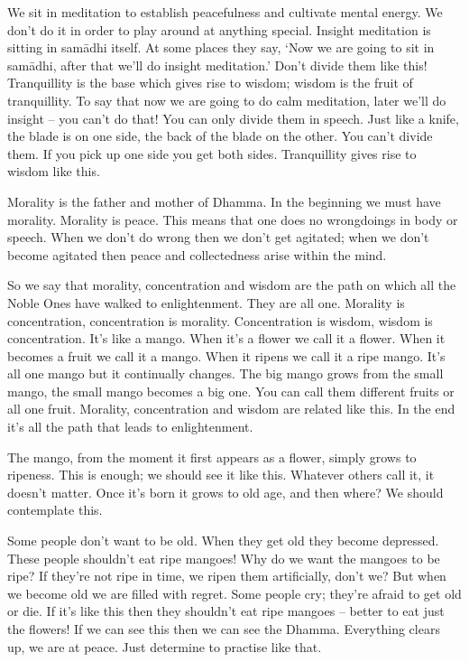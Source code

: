 We sit in meditation to establish peacefulness and cultivate mental energy. We don't do it in order to play around at anything special. Insight meditation is sitting in sam\=adhi itself. At some places they say, `Now we are going to sit in sam\=adhi, after that we'll do insight meditation.' Don't divide them like this! Tranquillity is the base which gives rise to wisdom; wisdom is the fruit of tranquillity. To say that now we are going to do calm meditation, later we'll do insight -- you can't do that! You can only divide them in speech. Just like a knife, the blade is on one side, the back of the blade on the other. You can't divide them. If you pick up one side you get both sides. Tranquillity gives rise to wisdom like this. 

Morality is the father and mother of Dhamma. In the beginning we must have morality. Morality is peace. This means that one does no wrongdoings in body or speech. When we don't do wrong then we don't get agitated; when we don't become agitated then peace and collectedness arise within the mind. 

So we say that morality, concentration and wisdom are the path on which all the Noble Ones have walked to enlightenment. They are all one. Morality is concentration, concentration is morality. Concentration is wisdom, wisdom is concentration. It's like a mango. When it's a flower we call it a flower. When it becomes a fruit we call it a mango. When it ripens we call it a ripe mango. It's all one mango but it continually changes. The big mango grows from the small mango, the small mango becomes a big one. You can call them different fruits or all one fruit. Morality, concentration and wisdom are related like this. In the end it's all the path that leads to enlightenment. 

The mango, from the moment it first appears as a flower, simply grows to ripeness. This is enough; we should see it like this. Whatever others call it, it doesn't matter. Once it's born it grows to old age, and then where? We should contemplate this. 

Some people don't want to be old. When they get old they become depressed. These people shouldn't eat ripe mangoes! Why do we want the mangoes to be ripe? If they're not ripe in time, we ripen them artificially, don't we? But when we become old we are filled with regret. Some people cry; they're afraid to get old or die. If it's like this then they shouldn't eat ripe mangoes -- better to eat just the flowers! If we can see this then we can see the Dhamma. Everything clears up, we are at peace. Just determine to practise like that. 

